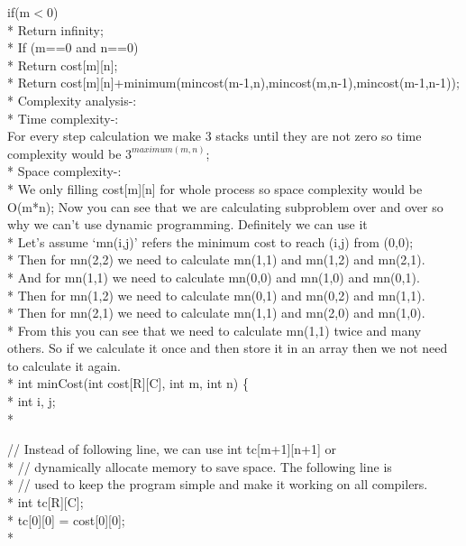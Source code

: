 \documentclass[12pt]{book}
\begin{document}
if(m$<$0)\\*
\phantom{x} \hspace{3ex}Return infinity;\\*
If (m==0 and n==0)\\*
\phantom{x} \hspace{3ex}Return cost[m][n];\\*
Return cost[m][n]+minimum(mincost(m-1,n),mincost(m,n-1),mincost(m-1,n-1));\\*
\newline
\newline
\newline
Complexity analysis-: \\*
\phantom{x} \hspace{3ex} Time complexity-:\\
For every step calculation we make 3 stacks until they are not zero so time complexity would be $3^{maximum(m,n)}$; \\*
Space complexity-: \\*
We only filling cost[m][n] for whole process so space complexity would be O(m*n);
Now you can see that we are calculating subproblem over and over so why we can’t use dynamic programming.
Definitely we can use it \\*
Let’s assume ‘mn(i,j)' refers the minimum cost  to reach (i,j) from (0,0); \\*
Then for  mn(2,2) we need to calculate mn(1,1) and mn(1,2) and mn(2,1).\\*
And for mn(1,1) we need  to calculate mn(0,0) and mn(1,0) and mn(0,1).\\*
Then for  mn(1,2) we need to calculate mn(0,1) and mn(0,2) and mn(1,1).\\*
Then for  mn(2,1) we need to calculate mn(1,1) and mn(2,0) and mn(1,0).\\*
\newline
From this you can see that we need to calculate mn(1,1) twice and many others. So if we calculate it once and then store it in an array then we not need to calculate it again.\\*
int minCost(int cost[R][C], int m, int n)
\{ \\*
\phantom{x} \hspace{3ex}     int i, j;\\*
  
\phantom{x} \hspace{3ex}     // Instead of following line, we can use int tc[m+1][n+1] or \\*
\phantom{x} \hspace{3ex}     // dynamically allocate memory to save space. The following line is\\*
\phantom{x} \hspace{3ex}     // used to keep the program simple and make it working on all compilers.\\*
\phantom{x} \hspace{3ex}     int tc[R][C];  \\*
\phantom{x} \hspace{3ex}     tc[0][0] = cost[0][0];\\*
  
\end{document}
